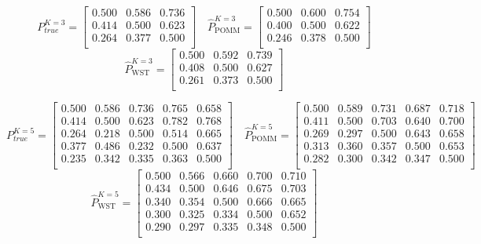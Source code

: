 \documentclass[11pt]{amsart}
\begin{document}
\newpage
\[
P^{K=3}_{true} = 
\left[\begin{array}{ccc}
0.500 & 0.586 & 0.736 \\
0.414 & 0.500 & 0.623 \\
0.264 & 0.377 & 0.500 \\
\end{array}\right] \quad 
\hat{P}^{K=3}_{\text{POMM}} = 
\left[\begin{array}{ccc}
0.500 & 0.600 & 0.754 \\
0.400 & 0.500 & 0.622 \\
0.246 & 0.378 & 0.500 \\
\end{array}\right] 
\]
\[ 
\hat{P}^{K=3}_{\text{WST}} = 
\left[\begin{array}{ccc}
0.500 & 0.592 & 0.739 \\
0.408 & 0.500 & 0.627 \\
0.261 & 0.373 & 0.500 \\ 
\end{array}\right]
\]

\[
P^{K=5}_{true} = 
\left[\begin{array}{ccccc}
0.500 & 0.586 & 0.736 & 0.765 & 0.658 \\
0.414 & 0.500 & 0.623 & 0.782 & 0.768 \\
0.264 & 0.218 & 0.500 & 0.514 & 0.665 \\
0.377 & 0.486 & 0.232 & 0.500 & 0.637 \\
0.235 & 0.342 & 0.335 & 0.363 & 0.500 \\
\end{array}\right] \quad 
\hat{P}^{K=5}_{\text{POMM}} = 
\left[\begin{array}{ccccc}
0.500 & 0.589 & 0.731 & 0.687 & 0.718 \\
0.411 & 0.500 & 0.703 & 0.640 & 0.700 \\
0.269 & 0.297 & 0.500 & 0.643 & 0.658 \\
0.313 & 0.360 & 0.357 & 0.500 & 0.653 \\
0.282 & 0.300 & 0.342 & 0.347 & 0.500 \\
\end{array}\right] 
\]
\[ 
\hat{P}^{K=5}_{\text{WST}} = 
\left[\begin{array}{ccccc}
0.500 & 0.566 & 0.660 & 0.700 & 0.710 \\
0.434 & 0.500 & 0.646 & 0.675 & 0.703 \\
0.340 & 0.354 & 0.500 & 0.666 & 0.665 \\
0.300 & 0.325 & 0.334 & 0.500 & 0.652 \\
0.290 & 0.297 & 0.335 & 0.348 & 0.500 \\
\end{array}\right]
\]
\end{document}
